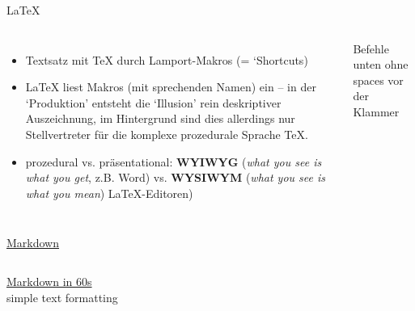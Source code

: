 \begin{frame}[fragile]{\LaTeX}

\begin{columns}
\small 
\begin{itemize}
    \item {} Textsatz mit \TeX{} durch Lamport-Makros (= `Shortcuts)
\item \LaTeX{} liest Makros (mit sprechenden Namen) ein -- in der `Produktion' entsteht die `Illusion' rein deskriptiver Auszeichnung, im Hintergrund sind dies allerdings nur Stellvertreter für die komplexe prozedurale Sprache \TeX . \item prozedural vs. präsentational: \textbf{WYIWYG} (\emph{what you see is what you get}, z.B. Word) vs. \textbf{WYSIWYM} (\emph{what you see is what you mean}) \LaTeX{}-Editoren) 
\end{itemize}
\footnotesize
Befehle unten ohne spaces vor der Klammer \\
\end{columns}

\end{frame}

\begin{frame}[fragile]{\href{https://commonmark.org/help}{Markdown}}
\begin{columns}
\href{https://commonmark.org/help}{Markdown in 60s}\\
simple text formatting ~
\\
\footnotesize
{}
\mycommand{![Image][http://url/a.png}{Bild}

\end{columns}

\end{frame}


